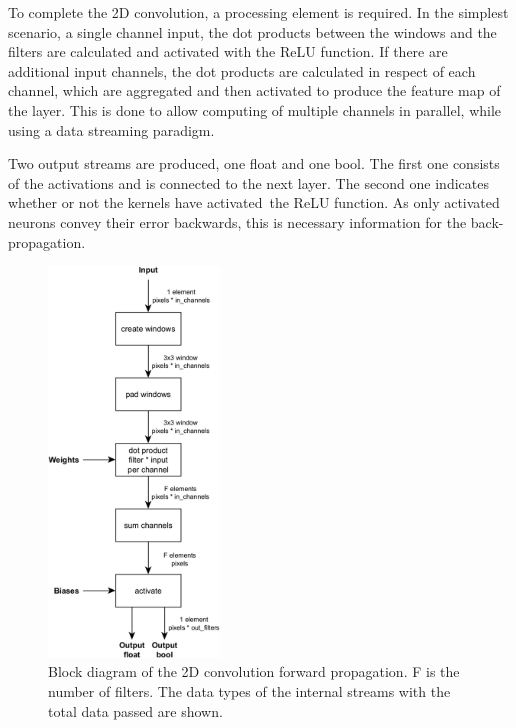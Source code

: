 To complete the 2D convolution, a processing element is required. In the simplest scenario, a single channel input, the dot products between the windows and the filters are calculated and activated with the ReLU function. If there are additional input channels, the dot products are calculated in respect of each channel, which are aggregated and then activated to produce the feature map of the layer. This is done to allow computing of multiple channels in parallel, while using a data streaming paradigm.

Two output streams are produced, one float and one bool. The first one consists of the activations and is connected to the next layer. The second one indicates whether or not the kernels have activated the ReLU function. As only activated neurons convey their error backwards, this is necessary information for the back-propagation.

\begin{figure}[H]
    \centering
        \includegraphics[width=0.406\textwidth]{Images/block_diagrams/conv2d_fp_mc.png}
        \decoRule
        \caption[Conv2D forward propagation block diagram]{Block diagram of the 2D convolution forward propagation. F is the number of filters. The data types of the internal streams with the total data passed are shown. }
        \label{fig: Conv2D forward propagation block diagram}
\end{figure}

